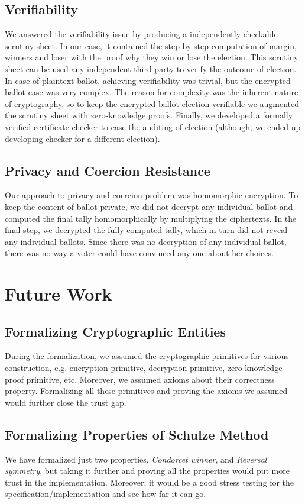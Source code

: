 \subsection{Verifiability}
We answered the verifiability issue by producing a 
independently checkable scrutiny sheet. In our case, 
it contained the step by step computation of margin, 
winners and loser with the proof why they win or 
lose the election. This scrutiny 
sheet can be used any independent third party to verify the 
outcome of election. In case of plaintext ballot, 
achieving verifiability was trivial, but the encrypted 
ballot case was very complex. The reason 
for complexity was the inherent nature of cryptography, 
so to keep the encrypted ballot election verifiable 
we augmented the scrutiny sheet with zero-knowledge proofs. 
Finally, we developed a formally verified certificate checker to ease the 
auditing of election (although, we ended up developing 
checker for a  different election). 

\subsection{Privacy and Coercion Resistance}
Our approach to privacy and coercion problem was homomorphic encryption. 
To keep the content of ballot private, we did not decrypt
any individual ballot and computed the final tally homomorphically 
by multiplying the ciphertexts. In the final step, we decrypted 
the fully computed tally, which 
in turn did not reveal any individual ballots.  Since there 
was no decryption of any individual ballot, there was 
no way a voter could have convinced any one about her 
choices. 


\section{Future Work}
\label{sec:future}
\subsection{Formalizing Cryptographic Entities}
During the formalization, we assumed the cryptographic primitives 
for various construction, e.g. encryption primitive, decryption primitive,
zero-knowledge-proof primitive, etc. Moreover,  
we assumed axioms about their correctness property. 
Formalizing all these primitives and proving the 
axioms we assumed would further close the trust 
gap.  


\subsection{Formalizing Properties of Schulze Method}
We have formalized just two properties, 
\textit{Condorcet winner}, and \textit{Reversal symmetry},
but taking it further and proving all the properties 
would put more trust in the implementation. Moreover, 
it would be a good stress testing for the specification/implementation 
and see how far it can go. 

